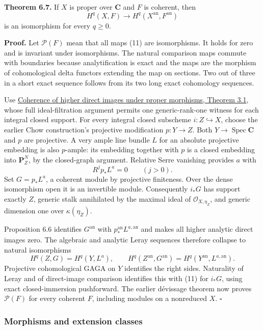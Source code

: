 \documentclass[11pt]{article}
\begin{document}
\textbf{Theorem 6.7.} If \(X\) is proper over \(\mathbf C\) and \(F\) is
coherent, then \[
H^q(X,F)\longrightarrow H^q(X^{\mathrm{an}},F^{\mathrm{an}})
\tag{11}
\] is an isomorphism for every \(q\ge0\).

\textbf{Proof.} Let \(\mathcal P(F)\) mean that all maps (11) are
isomorphisms. It holds for zero and is invariant under isomorphisms. The
natural comparison maps commute with boundaries because analytification
is exact and the maps are the morphism of cohomological delta functors
extending the map on sections. Two out of three in a short exact
sequence follows from its two long exact cohomology sequences.

Use
\href{proper-morphisms-and-coherent-direct-images.html\#3-the-property-form-of-dévissage}{Coherence
of higher direct images under proper morphisms, Theorem 3.1}, whose full
ideal-filtration argument permits one generic-rank-one witness for each
integral closed support. For every integral closed subscheme
\(i:Z\hookrightarrow X\), choose the earlier Chow construction's
projective modification \(p:Y\to Z\). Both
\(Y\to\operatorname{Spec}\mathbf C\) and \(p\) are projective. A very
ample line bundle \(L\) for an absolute projective embedding is also
\(p\)-ample: its embedding together with \(p\) is a closed embedding
into \(\mathbf P^N_Z\), by the closed-graph argument. Relative Serre
vanishing provides \(a\) with \[
R^jp_*L^a=0\qquad(j>0).
\] Set \(G=p_*L^a\), a coherent module by projective finiteness. Over
the dense isomorphism open it is an invertible module. Consequently
\(i_*G\) has support exactly \(Z\), generic stalk annihilated by the
maximal ideal of \(\mathcal O_{X,\eta_Z}\), and generic dimension one
over \(\kappa(\eta_Z)\).

Proposition 6.6 identifies \(G^{\mathrm{an}}\) with
\(p^{\mathrm{an}}_*L^{a,\mathrm{an}}\) and makes all higher analytic
direct images zero. The algebraic and analytic Leray sequences therefore
collapse to natural isomorphisms \[
H^q(Z,G)=H^q(Y,L^a),\qquad
H^q(Z^{\mathrm{an}},G^{\mathrm{an}})=H^q(Y^{\mathrm{an}},L^{a,\mathrm{an}}).
\] Projective cohomological GAGA on \(Y\) identifies the right sides.
Naturality of Leray and of direct-image comparison identifies this with
(11) for \(i_*G\), using exact closed-immersion pushforward. The earlier
dévissage theorem now proves \(\mathcal P(F)\) for every coherent \(F\),
including modules on a nonreduced \(X\). \(\square\)

\subsubsection{Morphisms and extension
classes}\label{morphisms-and-extension-classes}
\end{document}
